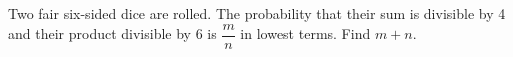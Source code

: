 Two fair six-sided dice are rolled. The probability that their sum is divisible by 4 and their product divisible by 6 is $\dfrac{m}{n}$ in lowest terms. Find $m+n$.
